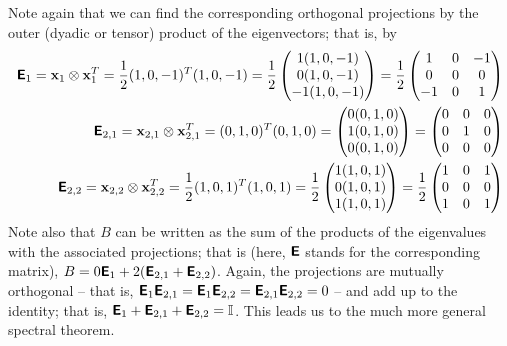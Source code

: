 {Note again that we can find the corresponding orthogonal projections by the outer (dyadic or tensor) product
of the eigenvectors; that is,  by
\begin{equation}
\begin{split}
\textsf{\textbf{E}}_1 =
{\bf x}_1 \otimes {\bf x}_1^T =
\frac{1}{2} (1,0,-1)^T(1,0,-1) =
\frac{1}{2}
\begin{pmatrix}
1(1,0,-1)\\
0(1,0,-1)\\
-1(1,0,-1)
\end{pmatrix} =
\frac{1}{2}
\begin{pmatrix}
1&0&-1\\
0&0&0\\
-1&0&1
\end{pmatrix}
\\
\textsf{\textbf{E}}_{2,1} =
{\bf x}_{2,1} \otimes {\bf x}_{2,1}^T =
(0,1,0)^T(0,1,0) =
\begin{pmatrix}
0(0,1,0)\\
1(0,1,0)\\
0(0,1,0)
\end{pmatrix} =
\begin{pmatrix}
0&0&0\\
0&1&0\\
0&0&0
\end{pmatrix}
\\
\textsf{\textbf{E}}_{2,2} =
{\bf x}_{2,2} \otimes {\bf x}_{2,2}^T =
\frac{1}{2} (1,0,1)^T(1,0,1) =
\frac{1}{2}
\begin{pmatrix}
1(1,0,1)\\
0(1,0,1)\\
1(1,0,1)
\end{pmatrix} =
\frac{1}{2}
\begin{pmatrix}
1&0&1\\
0&0&0\\
1&0&1
\end{pmatrix}
\end{split}
\end{equation}
Note also that $B$ can be written as the sum of the products of the
eigenvalues with the associated projections; that is (here, $\textsf{\textbf{E}}$
stands for the corresponding matrix),
$B= 0  \textsf{\textbf{E}}_1 + 2 (\textsf{\textbf{E}}_{2,1} + \textsf{\textbf{E}}_{2,2} )$.
Again, the projections are mutually orthogonal
-- that is,
$\textsf{\textbf{E}}_1 \textsf{\textbf{E}}_{2,1} = \textsf{\textbf{E}}_1\textsf{\textbf{E}}_{2,2}=
\textsf{\textbf{E}}_{2,1}\textsf{\textbf{E}}_{2,2}=0$
--
and add up to the identity; that is,
$\textsf{\textbf{E}}_1+\textsf{\textbf{E}}_{2,1}+\textsf{\textbf{E}}_{2,2}={\Bbb I}$.
This leads us to the much more general spectral theorem.

}
